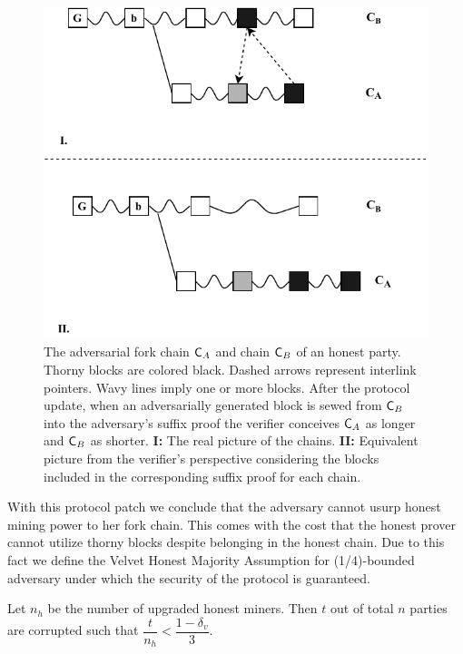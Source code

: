 \begin{figure}[h!]
	\begin{center}
		\includegraphics[width=0.9\columnwidth]{figures/injection.pdf}
	\end{center}
	\caption{The adversarial fork chain $\mathsf{C}_A$ and chain $\mathsf{C}_B$ of an honest party. Thorny blocks are colored black. Dashed arrows represent interlink pointers. Wavy lines imply one or more blocks. After the protocol update, when an adversarially generated block is sewed from $\mathsf{C}_B$ into the adversary's suffix proof the verifier conceives $\mathsf{C}_A$ as longer and $\mathsf{C}_B$ as shorter. \textbf{I:} The real picture of the chains. \textbf{II:} Equivalent picture from the verifier's perspective considering the blocks included in the corresponding suffix proof for each chain.}
	\label{fig:injection}
\end{figure}

With this protocol patch we conclude that the adversary cannot usurp honest mining power to her fork chain. This comes with the cost that the honest prover cannot utilize thorny blocks despite belonging in the honest chain. Due to this fact we define the Velvet Honest Majority Assumption for (1/4)-bounded adversary under which the security of the protocol is guaranteed.

\begin{definition}
	Let $n_h$ be the number of upgraded honest miners. Then $t$ out of total $n$ parties are corrupted such that $\dfrac{t}{n_h} < \dfrac{1 - \delta_v}{3} $.
	\label{defn:velvet_honest_majority}
\end{definition}

